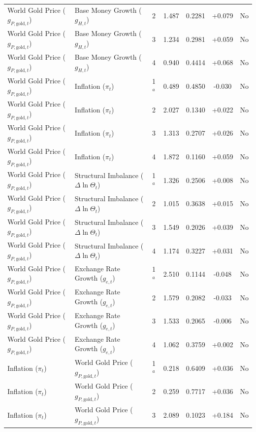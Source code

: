 \begin{table}[p]
{\begin{tabular}{llccccc}
World Gold Price ($g_{P,\text{gold},t}$) & Base Money Growth ($g_{H,t}$) & 2 & 1.487 & 0.2281 & +0.079 & No \\
World Gold Price ($g_{P,\text{gold},t}$) & Base Money Growth ($g_{H,t}$) & 3 & 1.234 & 0.2981 & +0.059 & No \\
World Gold Price ($g_{P,\text{gold},t}$) & Base Money Growth ($g_{H,t}$) & 4 & 0.940 & 0.4414 & +0.068 & No \\
World Gold Price ($g_{P,\text{gold},t}$) & Inflation ($\pi_t$) & 1$^a$ & 0.489 & 0.4850 & -0.030 & No \\
World Gold Price ($g_{P,\text{gold},t}$) & Inflation ($\pi_t$) & 2 & 2.027 & 0.1340 & +0.022 & No \\
World Gold Price ($g_{P,\text{gold},t}$) & Inflation ($\pi_t$) & 3 & 1.313 & 0.2707 & +0.026 & No \\
World Gold Price ($g_{P,\text{gold},t}$) & Inflation ($\pi_t$) & 4 & 1.872 & 0.1160 & +0.059 & No \\
World Gold Price ($g_{P,\text{gold},t}$) & Structural Imbalance ($\Delta \ln \Theta_t$) & 1$^a$ & 1.326 & 0.2506 & +0.008 & No \\
World Gold Price ($g_{P,\text{gold},t}$) & Structural Imbalance ($\Delta \ln \Theta_t$) & 2 & 1.015 & 0.3638 & +0.015 & No \\
World Gold Price ($g_{P,\text{gold},t}$) & Structural Imbalance ($\Delta \ln \Theta_t$) & 3 & 1.549 & 0.2026 & +0.039 & No \\
World Gold Price ($g_{P,\text{gold},t}$) & Structural Imbalance ($\Delta \ln \Theta_t$) & 4 & 1.174 & 0.3227 & +0.031 & No \\
World Gold Price ($g_{P,\text{gold},t}$) & Exchange Rate Growth ($g_{e,t}$) & 1$^a$ & 2.510 & 0.1144 & -0.048 & No \\
World Gold Price ($g_{P,\text{gold},t}$) & Exchange Rate Growth ($g_{e,t}$) & 2 & 1.579 & 0.2082 & -0.033 & No \\
World Gold Price ($g_{P,\text{gold},t}$) & Exchange Rate Growth ($g_{e,t}$) & 3 & 1.533 & 0.2065 & -0.006 & No \\
World Gold Price ($g_{P,\text{gold},t}$) & Exchange Rate Growth ($g_{e,t}$) & 4 & 1.062 & 0.3759 & +0.002 & No \\
Inflation ($\pi_t$) & World Gold Price ($g_{P,\text{gold},t}$) & 1$^a$ & 0.218 & 0.6409 & +0.036 & No \\
Inflation ($\pi_t$) & World Gold Price ($g_{P,\text{gold},t}$) & 2 & 0.259 & 0.7717 & +0.036 & No \\
Inflation ($\pi_t$) & World Gold Price ($g_{P,\text{gold},t}$) & 3 & 2.089 & 0.1023 & +0.184 & No \\

\end{tabular}}
\end{table}
